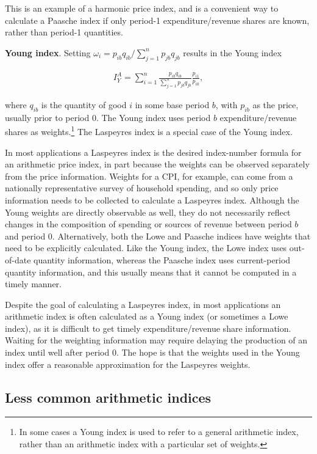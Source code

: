 \documentclass[]{article}
\begin{document}
This is an example of a harmonic price index, and is a convenient way to calculate a Paasche index if only period-1 expenditure/revenue shares are known, rather than period-1 quantities.

\textbf{Young index}. Setting \(\omega_{i} = p_{ib} q_{ib} / \sum_{j = 1}^{n} p_{jb} q_{jb}\) results in the Young index

\begin{align*}
I^{A}_{Y} = \sum_{i = 1}^{n} \frac{p_{ib} q_{ib}}{\sum_{j = 1}^{n} p_{jb} q_{jb}} \frac{p_{i1}}{p_{i0}},
\end{align*}

where \(q_{ib}\) is the quantity of good \(i\) in some base period \(b\), with \(p_{ib}\) as the price, usually prior to period 0. The Young index uses period \(b\) expenditure/revenue shares as weights.\footnote{In some cases a Young index is used to refer to a general arithmetic index, rather than an arithmetic index with a particular set of weights.} The Laspeyres index is a special case of the Young index.

In most applications a Laspeyres index is the desired index-number formula for an arithmetic price index, in part because the weights can be observed separately from the price information. Weights for a CPI, for example, can come from a nationally representative survey of household spending, and so only price information needs to be collected to calculate a Laspeyres index. Although the Young weights are directly observable as well, they do not necessarily reflect changes in the composition of spending or sources of revenue between period \(b\) and period 0. Alternatively, both the Lowe and Paasche indices have weights that need to be explicitly calculated. Like the Young index, the Lowe index uses out-of-date quantity information, whereas the Paasche index uses current-period quantity information, and this usually means that it cannot be computed in a timely manner.

Despite the goal of calculating a Laspeyres index, in most applications an arithmetic index is often calculated as a Young index (or sometimes a Lowe index), as it is difficult to get timely expenditure/revenue share information. Waiting for the weighting information may require delaying the production of an index until well after period 0. The hope is that the weights used in the Young index offer a reasonable approximation for the Laspeyres weights.

\hypertarget{less-common-arithmetic-indices}{%
\subsection{Less common arithmetic indices}\label{less-common-arithmetic-indices}}
\end{document}

